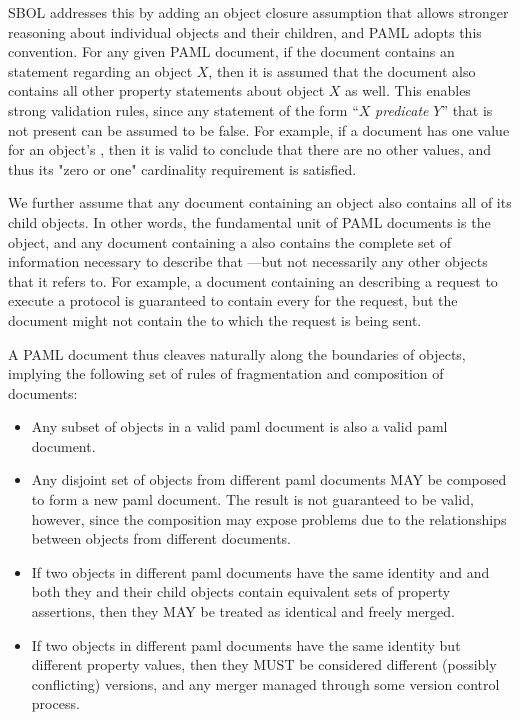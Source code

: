 SBOL addresses this by adding an object closure assumption that allows stronger reasoning about individual objects and their children, and PAML adopts this convention.
For any given PAML document, if the document contains an  statement regarding an  object $X$, then it is assumed that the document also contains all other property statements about object $X$ as well. 
This enables strong validation rules, since any statement of the form ``$X$ {\it predicate} $Y$'' that is not present can be assumed to be false.
For example, if a document has one value for an object's , then it is valid to conclude that there are no other  values, and thus its "zero or one" cardinality requirement is satisfied.

We further assume that any document containing an object also contains all of its child objects.
In other words, the fundamental unit of PAML documents is the  object, and any document containing a  also contains the complete set of information necessary to describe that ---but not necessarily any other  objects that it refers to.
For example, a document containing an  describing a request to execute a protocol is guaranteed to contain every  for the request, but the document might not contain the  to which the request is being sent.

A PAML document thus cleaves naturally along the boundaries of  objects, implying the following set of rules of fragmentation and composition of documents:
\begin{itemize}
\item Any subset of  objects in a valid paml document is also a valid paml document.
\item Any disjoint set of  objects from different paml documents MAY be composed to form a new paml document. The result is not guaranteed to be valid, however, since the composition may expose problems due to the relationships between  objects from different documents.
\item If two  objects in different paml documents have the same identity and and both they and their child objects contain equivalent sets of property assertions, then they MAY be treated as identical and freely merged. 
\item  If two  objects in different paml documents have the same identity but different property values, then they MUST be considered different (possibly conflicting) versions, and any merger managed through some version control process.
\end{itemize}


